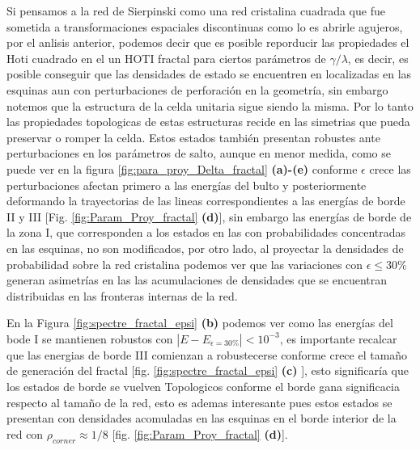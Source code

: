 Si pensamos a la red de Sierpinski como una red cristalina cuadrada que fue sometida a transformaciones espaciales discontinuas como lo es abrirle agujeros, por el anlisis anterior, podemos decir que es posible reporducir las propiedades el Hoti cuadrado en el un HOTI fractal para ciertos parámetros de $\gamma/\lambda$, es decir, es posible conseguir que las densidades de estado se encuentren en localizadas en las esquinas aun con perturbaciones de perforación en la geometría, sin embargo notemos que la estructura de la celda unitaria sigue siendo la misma. Por lo tanto las propiedades topologicas de estas estructuras recide en las simetrias que pueda preservar o romper la celda. 
Estos estados también presentan robustes ante perturbaciones en los parámetros de salto, aunque en menor medida, como se puede ver en la figura \ref{fig:para_proy_Delta_fractal} \textbf{(a)-(e)} conforme $\epsilon$ crece las perturbaciones afectan primero a las energías del bulto y posteriormente deformando la trayectorias de las lineas correspondientes a las energías de borde II y III [Fig. \ref{fig:Param_Proy_fractal} \textbf{(d)}], sin embargo las energías de borde de la zona I,  que corresponden a los estados en las con probabilidades concentradas en las esquinas, no son modificados, por otro lado, al proyectar la densidades de probabilidad sobre la red cristalina podemos ver que las variaciones con $\epsilon \leq 30\%$ generan asimetrías en las las acumulaciones de densidades que se encuentran distribuidas en las fronteras internas de la red.

En la Figura \ref{fig:spectre_fractal_epsi} \textbf{(b)} podemos ver como las energías del bode I  se mantienen robustos con $|E - E_{\epsilon = 30\%}| < 10^{-3}$, es importante recalcar que las energias de borde III comienzan a robustecerse conforme crece el tamaño de generación del fractal [fig. \ref{fig:spectre_fractal_epsi} \textbf{(c)} ], esto significaría que los estados de borde se vuelven Topologicos conforme el borde gana significacia respecto al tamaño de la red, esto es ademas interesante pues estos estados se presentan con densidades acomuladas en las esquinas en el borde interior de la red con $\rho_{corner} \approx 1/8$ [fig. \ref{fig:Param_Proy_fractal} \textbf{(d)}]. 







